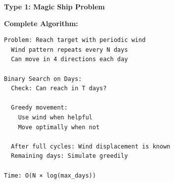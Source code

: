 \documentclass[11pt,a4paper,oneside]{book}
\begin{document}
\begin{tcolorbox}[
    enhanced,breakable,
    colback=lightgray,
    colframe=accentorange,
    boxrule=2pt,
    arc=4mm,
    title=\textbf{Complete Periodic Movement Algorithms}
]
\textbf{Type 1: Magic Ship Problem}

\textbf{Complete Algorithm:}
\begin{verbatim}
Problem: Reach target with periodic wind
  Wind pattern repeats every N days
  Can move in 4 directions each day
  
Binary Search on Days:
  Check: Can reach in T days?
  
  Greedy movement:
    Use wind when helpful
    Move optimally when not
    
  After full cycles: Wind displacement is known
  Remaining days: Simulate greedily

Time: O(N × log(max_days))
\end{verbatim}
\end{tcolorbox}
\end{document}
